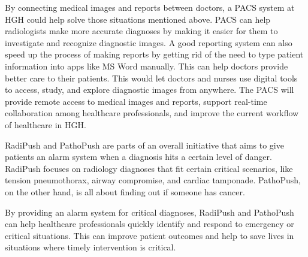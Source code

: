 \documentclass{article}
\begin{document}

By connecting medical images and reports between doctors, a PACS system at HGH could help solve those situations mentioned above.
PACS can help radiologists make more accurate diagnoses by making it easier for them to investigate and recognize diagnostic images. A good reporting system can also speed up the process of making reports by getting rid of the need to type patient information into apps like MS Word manually. This can help doctors provide better care to their patients.
This would let doctors and nurses use digital tools to access, study, and explore diagnostic images from anywhere. 
The PACS will provide remote access to medical images and reports, support real-time collaboration among healthcare professionals, and improve the current workflow of healthcare in HGH.

RadiPush and PathoPush are parts of an overall initiative that aims to give patients an alarm system when a diagnosis hits a certain level of danger. RadiPush focuses on radiology diagnoses that fit certain critical scenarios, like tension pneumothorax, airway compromise, and cardiac tamponade. PathoPush, on the other hand, is all about finding out if someone has cancer.

By providing an alarm system for critical diagnoses, RadiPush and PathoPush can help healthcare professionals quickly identify and respond to emergency or critical situations. This can improve patient outcomes and help to save lives in situations where timely intervention is critical.
\end{document}
